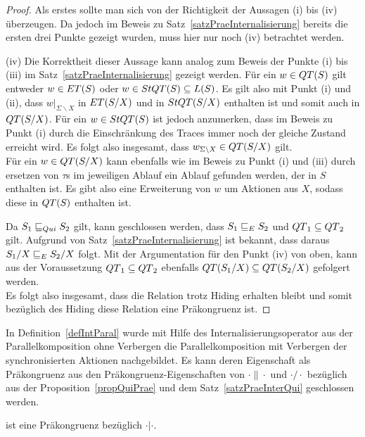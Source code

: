 \begin{proof}
  Als erstes sollte man sich von der Richtigkeit der Aussagen (i) bis (iv)
  überzeugen. Da jedoch im Beweis zu Satz~\ref{satzPraeInternalisierung}
  bereits die ersten drei Punkte gezeigt wurden, muss hier nur noch (iv)
  betrachtet werden.

  (iv)
  Die Korrektheit dieser Aussage kann analog zum Beweis der Punkte (i) bis
  (iii) im Satz~\ref{satzPraeInternalisierung} gezeigt werden. Für ein $w\in
  QT{}(S)$ gilt entweder $w\in ET{}(S)$ oder $w\in StQT{}(S)\subseteq L(S)$. Es
  gilt also mit Punkt (i) und (ii), dass $w|_{\Sigma\backslash X}$ in
  $ET{}(S/X)$ und in $StQT{}(S/X)$ enthalten ist und somit auch in
  $QT{}(S/X)$. Für ein $w\in StQT{}(S)$ ist jedoch anzumerken, dass im Beweis
  zu Punkt (i) durch die Einschränkung des Traces immer noch der gleiche
  Zustand erreicht wird. Es folgt also insgesamt, dass $w _{\Sigma\backslash
  X}\in QT{}(S/X)$ gilt.\\
  Für ein $w\in QT{}(S/X)$ kann ebenfalls wie im Beweis zu Punkt (i) und (iii)
  durch ersetzen von $\tau$s im jeweiligen Ablauf ein Ablauf gefunden werden,
  der in $S$ enthalten ist. Es gibt also eine Erweiterung von $w$ um Aktionen
  aus $X$, sodass diese in $QT{}(S)$ enthalten ist.

  Da $S_1\sqsubseteq _{Qui} S_2$ gilt, kann geschlossen werden, dass $S_1\sqsubseteq _E S_2$ und
  $QT{}_1\subseteq QT{}_2$ gilt. Aufgrund von
  Satz~\ref{satzPraeInternalisierung} ist bekannt, dass daraus $S_1/X\sqsubseteq _E
  S_2/X$ folgt. Mit der Argumentation für den Punkt (iv) von oben, kann aus der
  Voraussetzung $QT{}_1\subseteq QT{}_2$ ebenfalls $QT{}(S_1/X)\subseteq
  QT{}(S_2/X)$ gefolgert werden.\\
  Es folgt also insgesamt, dass die Relation \QRel{} trotz Hiding erhalten
  bleibt und somit bezüglich des Hiding diese Relation eine Präkongruenz ist.
\end{proof}

In Definition~\ref{defIntParal} wurde mit Hilfe des Internalisierungsoperator
aus der Parallelkomposition ohne Verbergen die Parallelkomposition mit
Verbergen der synchronisierten Aktionen nachgebildet. Es kann deren
Eigenschaft als Präkongruenz aus den Präkongruenz-Eigenschaften von
$\cdot\|\cdot$ und $\cdot /\cdot$ bezüglich \QRel{} aus der
Proposition~\ref{propQuiPrae} und dem Satz~\ref{satzPraeInterQui} geschlossen
werden.

\begin{kor}
  \QRel{} ist eine Präkongruenz bezüglich $\cdot |\cdot$.
\end{kor}

